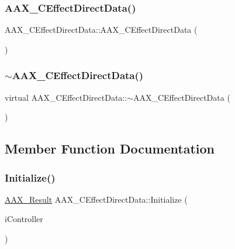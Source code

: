 \subsubsection{\texorpdfstring{AAX\_CEffectDirectData()}{AAX\_CEffectDirectData()}}
{\footnotesize\ttfamily A\+A\+X\+\_\+\+C\+Effect\+Direct\+Data\+::\+A\+A\+X\+\_\+\+C\+Effect\+Direct\+Data (\begin{DoxyParamCaption}\item[{void}]{ }\end{DoxyParamCaption})}

\mbox{\label{a01473_a8dd2b1e2a6464cd59319047185e4e899}} 
\subsubsection{\texorpdfstring{$\sim$AAX\_CEffectDirectData()}{~AAX\_CEffectDirectData()}}
{\footnotesize\ttfamily virtual A\+A\+X\+\_\+\+C\+Effect\+Direct\+Data\+::$\sim$\+A\+A\+X\+\_\+\+C\+Effect\+Direct\+Data (\begin{DoxyParamCaption}\item[{void}]{ }\end{DoxyParamCaption})\hspace{0.3cm}{\ttfamily [virtual]}}



\subsection{Member Function Documentation}
\mbox{\label{a01473_ad89ee93781539d8df3b0710a186c7e0d}} 
\subsubsection{\texorpdfstring{Initialize()}{Initialize()}}
{\footnotesize\ttfamily \mbox{\hyperlink{a00392_a4d8f69a697df7f70c3a8e9b8ee130d2f}{A\+A\+X\+\_\+\+Result}} A\+A\+X\+\_\+\+C\+Effect\+Direct\+Data\+::\+Initialize (\begin{DoxyParamCaption}\item[{\mbox{\hyperlink{a01409}{I\+A\+C\+F\+Unknown}} $\ast$}]{i\+Controller }\end{DoxyParamCaption})\hspace{0.3cm}{\ttfamily [virtual]}}



